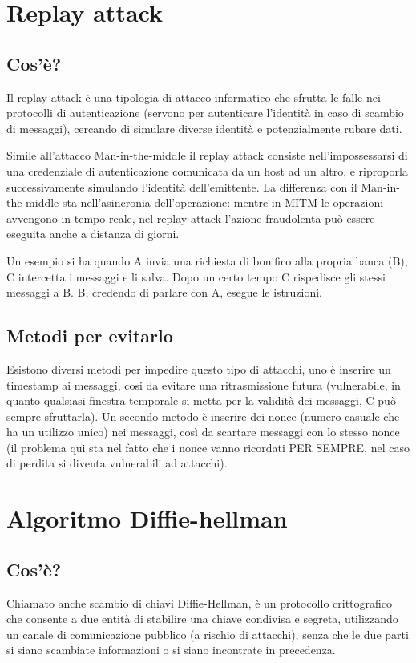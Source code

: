 \section{Replay attack}
\subsection{Cos'è?}
Il replay attack è una tipologia di attacco informatico che sfrutta le falle nei protocolli di autenticazione (servono per autenticare l’identità in caso di scambio di messaggi), cercando di simulare diverse identità e potenzialmente rubare dati.

Simile all’attacco Man-in-the-middle il replay attack consiste nell'impossessarsi di una credenziale di autenticazione comunicata da un host ad un altro, e riproporla successivamente simulando l'identità dell'emittente. La differenza con il Man-in-the-middle sta nell’asincronia dell’operazione: mentre in MITM le operazioni avvengono in tempo reale, nel replay attack l’azione fraudolenta può essere eseguita anche a distanza di giorni.

Un esempio si ha quando A invia una richiesta di bonifico alla propria banca (B), C intercetta i messaggi e li salva. Dopo un certo tempo C rispedisce gli stessi messaggi a B. B, credendo di parlare con A, esegue le istruzioni. 
\subsection{Metodi per evitarlo}
Esistono diversi metodi per impedire questo tipo di attacchi, uno è inserire un timestamp ai messaggi, cosi da evitare una ritrasmissione futura (vulnerabile, in quanto qualsiasi finestra temporale si metta per la validità dei messaggi, C può sempre sfruttarla).
Un secondo metodo è inserire dei nonce (numero casuale che ha un utilizzo unico) nei messaggi, così da scartare messaggi con lo stesso nonce (il problema qui sta nel fatto che i nonce vanno ricordati PER SEMPRE, nel caso di perdita si diventa vulnerabili ad attacchi).

\section{Algoritmo Diffie-hellman}
\subsection{Cos'è?}
Chiamato anche scambio di chiavi Diffie-Hellman, è un protocollo crittografico che consente a due entità di stabilire una chiave condivisa e segreta, utilizzando un canale di comunicazione pubblico (a rischio di attacchi), senza che le due parti si siano scambiate informazioni o si siano incontrate in precedenza.

